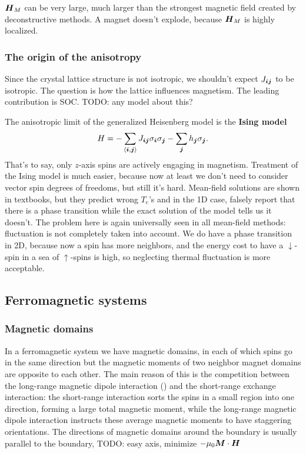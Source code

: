 \documentclass[hyperref, a4paper]{article}
\newcommand*{\pair}[1]{\langle #1 \rangle}
\newcommand*{\concept}[1]{{\textbf{#1}}}
\newcommand*{\Tc}{T_{\text{c}}}
\begin{document}
$\vb*{H}_{M}$ can be very large,
much larger than the strongest magnetic field created 
by deconstructive methods.
A magnet doesn't explode, 
because $\vb*{H}_M$ is highly localized.

\subsubsection{The origin of the anisotropy}

Since the crystal lattice structure is not isotropic, 
we shouldn't expect $J_{\vb*{i} \vb*{j}}$ to be isotropic.
The question is how the lattice influences magnetism.
The leading contribution is SOC. TODO: any model about this?

The anisotropic limit of the generalized Heisenberg model is the \concept{Ising model}
\begin{equation}
    H = - \sum_{\pair{\vb*{i}, \vb*{j}}} J_{\vb*{i} \vb*{j}} \sigma_{\vb*{i}} \sigma_{\vb*{j}}
    - \sum_{\vb*{j}} h_{\vb*{j}} \sigma_{\vb*{j}}.
\end{equation}
That's to say, only $z$-axis spins are actively engaging in magnetism.
Treatment of the Ising model is much easier,
because now at least we don't need to consider vector spin degrees of freedoms,
but still it's hard. 
Mean-field solutions are shown in textbooks, 
but they predict wrong $\Tc$'s 
and in the 1D case, falsely report that there is a phase transition 
while the exact solution of the model tells us 
it doesn't. 
The problem here is again universally seen in all mean-field methods:
fluctuation is not completely taken into account. 
We do have a phase transition in 2D,
because now a spin has more neighbors, 
and the energy cost to have a $\downarrow$-spin 
in a sea of $\uparrow$-spins is high, 
so neglecting thermal fluctuation is more acceptable. 

\subsection{Ferromagnetic systems}

\subsubsection{Magnetic domains}

In a ferromagnetic system 
we have magnetic domains, 
in each of which spins go in the same direction 
but the magnetic moments of two neighbor magnet domains
are opposite to each other.
The main reason of this is the competition between 
the long-range magnetic dipole interaction ()
and the short-range exchange interaction:
the short-range interaction sorts the spins in a small region into one direction,
forming a large total magnetic moment,
while the long-range magnetic dipole interaction 
instructs these average magnetic moments to have staggering orientations.
The directions of magnetic domains around the boundary is usually parallel to the boundary,
TODO: easy axis, minimize $- \mu_0 \vb*{M} \cdot \vb*{H}$
\end{document}
